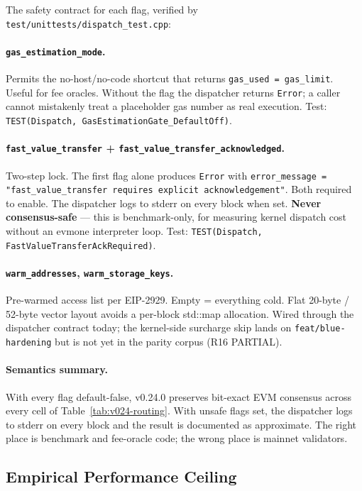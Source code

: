 The safety contract for each flag, verified by
\texttt{test/unittests/dispatch\_test.cpp}:

\paragraph{\texttt{gas\_estimation\_mode}.} Permits the no-host/no-code
shortcut that returns \texttt{gas\_used = gas\_limit}. Useful for fee
oracles. Without the flag the dispatcher returns \texttt{Error}; a
caller cannot mistakenly treat a placeholder gas number as real
execution. Test:
\texttt{TEST(Dispatch, GasEstimationGate\_DefaultOff)}.

\paragraph{\texttt{fast\_value\_transfer} +
\texttt{fast\_value\_transfer\_acknowledged}.} Two-step lock. The first
flag alone produces \texttt{Error} with
\texttt{error\_message = "fast\_value\_transfer requires explicit
acknowledgement"}. Both required to enable. The dispatcher logs to
stderr on every block when set. \textbf{Never consensus-safe} --- this
is benchmark-only, for measuring kernel dispatch cost without an
evmone interpreter loop. Test:
\texttt{TEST(Dispatch, FastValueTransferAckRequired)}.

\paragraph{\texttt{warm\_addresses}, \texttt{warm\_storage\_keys}.}
Pre-warmed access list per EIP-2929. Empty = everything cold. Flat
20-byte / 52-byte vector layout avoids a per-block std::map allocation.
Wired through the dispatcher contract today; the kernel-side surcharge
skip lands on \texttt{feat/blue-hardening} but is not yet in the
parity corpus (R16 PARTIAL).

\paragraph{Semantics summary.} With every flag default-false, v0.24.0
preserves bit-exact EVM consensus across every cell of
Table~\ref{tab:v024-routing}. With unsafe flags set, the dispatcher
logs to stderr on every block and the result is documented as
approximate. The right place is benchmark and fee-oracle code; the
wrong place is mainnet validators.

\subsection{Empirical Performance Ceiling}
\label{sec:v024:perf}

